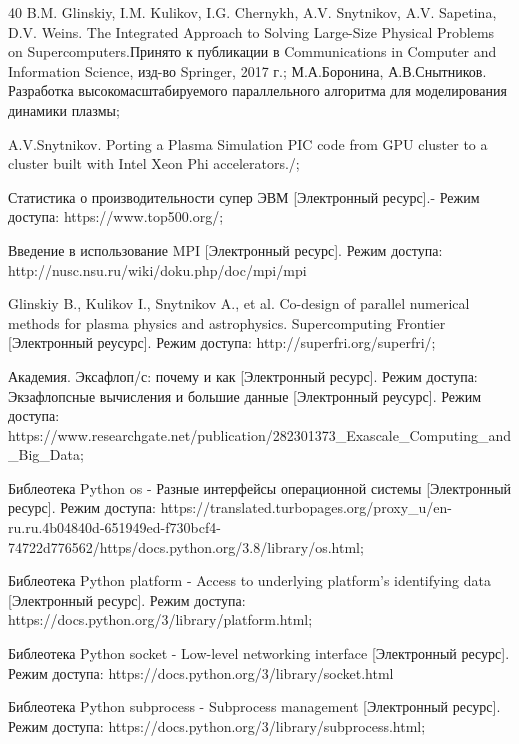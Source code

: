 \documentclass{article}
\begin{document}
\begin{thebibliography} {40}
B.M. Glinskiy, I.M. Kulikov, I.G. Chernykh, A.V. Snytnikov, A.V. Sapetina, D.V. Weins.  The Integrated Approach to Solving Large-Size Physical Problems on Supercomputers.Принято к публикации в Communications in Computer and Information Science, изд-во Springer, 2017 г.;
 М.А.Боронина, А.В.Снытников. Разработка высокомасштабируемого параллельного алгоритма для моделирования динамики плазмы;

A.V.Snytnikov.  Porting a Plasma Simulation PIC code from GPU cluster to a cluster built with Intel Xeon Phi accelerators./;

Статистика о производительности  супер ЭВМ [Электронный ресурс].- Режим доступа: https://www.top500.org/;

Введение в использование MPI [Электронный ресурс]. Режим доступа: http://nusc.nsu.ru/wiki/doku.php/doc/mpi/mpi

Glinskiy B., Kulikov I., Snytnikov A., et al. Co-design of parallel numerical methods for plasma physics and astrophysics. Supercomputing Frontier [Электронный реусурс]. Режим доступа: http://superfri.org/superfri/;

Академия. Эксафлоп/с: почему и как [Электронный ресурс].
Режим доступа: \href{https://www.academia.edu/95135711/Exaflop_s_The_why_and_the_how}

Экзафлопсные вычисления и большие данные [Электронный реусурс]. Режим доступа: 
https://www.researchgate.net/publication/282301373\_Exascale\_Computing\_and\_Big\_Data;

Библеотека Python os - Разные интерфейсы операционной системы [Электронный ресурс]. Режим доступа: https://translated.turbopages.org/proxy_u/en-ru.ru.4b04840d-651949ed-f730bcf4-74722d776562/https/docs.python.org/3.8/library/os.html;

Библеотека Python platform - Access to underlying platform’s identifying data [Электронный ресурс]. Режим доступа: https://docs.python.org/3/library/platform.html;

Библеотека Python socket - Low-level networking interface [Электронный ресурс]. Режим доступа: https://docs.python.org/3/library/socket.html

Библеотека Python subprocess - Subprocess management  [Электронный ресурс]. Режим доступа: https://docs.python.org/3/library/subprocess.html;


\end{thebibliography}
\end{document}
